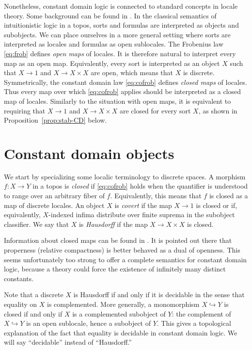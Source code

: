 \documentclass[a4paper,12pt]{article}
\begin{document}
Nonetheless, constant domain logic is connected to standard concepts in locale theory. Some background can be found in \cite[C]{Johnstone2002v2}. In the classical semantics of intuitionistic logic in a topos, sorts and formulas are interpreted as objects and subobjects. We can place ourselves in a more general setting where sorts are interpreted as locales and formulas as open sublocales. The Frobenius law \eqref{eq:frob} defines \emph{open maps} of locales. It is therefore natural to interpret every map as an open map. Equivalently, every sort is interpreted as an object $X$ such that $X→1$ and $X→X×X$ are open, which means that $X$ is discrete. Symmetrically, the constant domain law \eqref{eq:cofrob} defines \emph{closed maps} of locales. Thus every map over which \eqref{eq:cofrob} applies should be interpreted as a closed map of locales. Similarly to the situation with open maps, it is equivalent to requiring that $X→1$ and $X→X×X$ are closed for every sort $X$, as shown in Proposition~\ref{prop:stab-CD} below.

\section{Constant domain objects}

We start by specializing some localic terminology to discrete spaces. A morphism $f : X→Y$ in a topos is \emph{closed} if \eqref{eq:cofrob} holds when the quantifier is understood to range over an arbitrary fiber of $f$. Equivalently, this means that $f$ is closed as a map of discrete locales. An object $X$ is \emph{covert} if the map $X→1$ is closed or if, equivalently, $X$-indexed infima distribute over finite suprema in the subobject classifier. We say that $X$ is \emph{Hausdorff} if the map $X→X×X$ is closed.

Information about closed maps can be found in \cite[C3.2]{Johnstone2002v2}. It is pointed out there that properness (relative compactness) is better behaved as a dual of openness. This seems unfortunately too strong to offer a complete semantics for constant domain logic, because a theory could force the existence of infinitely many distinct constants.

Note that a discrete $X$ is Hausdorff if and only if it is decidable in the sense that equality on $X$ is complemented. More generally, a monomorphism $X↪Y$ is closed if and only if $X$ is a complemented subobject of $Y$: the complement of $X↪Y$ is an open sublocale, hence a subobject of $Y$. This gives a topological explanation of the fact that equality is decidable in constant domain logic. We will say ``decidable'' instead of ``Hausdorff.''
\end{document}
